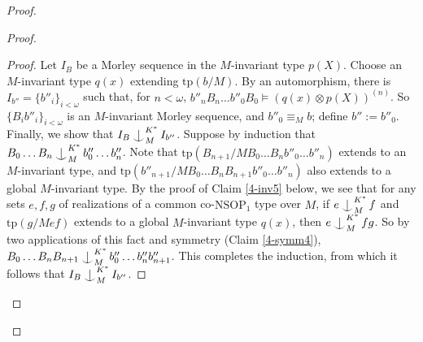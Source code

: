 \documentclass[12pt]{amsart}
\theoremstyle{definition}
\def\Ind#1#2{#1\setbox0=\hbox{$#1x$}\kern\wd0\hbox to 0pt{\hss$#1\mid$\hss}
\lower.9\ht0\hbox to 0pt{\hss$#1\smile$\hss}\kern\wd0}
\def\ind{\mathop{\mathpalette\Ind{}}}
\begin{document}
\begin{proof}
\begin{proof}
    \begin{proof}
    Let $I_{B}$ be a Morley sequence in the $M$-invariant type $p(X)$. Choose an $M$-invariant type $q(x)$ extending $\mathrm{tp}(b/M)$. By an automorphism, there is $I_{b''}=\{b''_{i}\}_{i < \omega}$ such that, for $n < \omega$, $b''_{n}B_{n} \ldots b''_{0}B_{0}\models (q(x)\otimes p(X))^{(n)} $. So $\{B_{i} b''_{i}\}_{i < \omega}$ is an $M$-invariant Morley sequence, and $b''_{0} \equiv_{M} b$; define $b'' := b''_{0}$. Finally, we show that $I_{B} \ind^{K^{*}}_{M} I_{b''}$. Suppose by induction that $B_{0} \ldots B_{n}\ind^{K^{*}}_{M}b''_{0} \ldots b''_{n}$. Note that $\mathrm{tp}(B_{n+1}/MB_{0}\ldots B_{n} b''_{0} \ldots b''_{n})$ extends to an $M$-invariant type, and $\mathrm{tp}(b''_{n+1}/MB_{0}\ldots B_{n}B_{n+1} b''_{0} \ldots b''_{n})$ also extends to a global $M$-invariant type. By the proof of Claim \ref{4-inv5} below, we see that for any sets $e, f, g$ of realizations of a common co-$\mathrm{NSOP}_{1}$ type over $M$, if $e \ind^{K^{*}}_{M} f$ and $\mathrm{tp}(g/Mef)$ extends to a global $M$-invariant type $q(x)$, then $e \ind^{K^{*}}_{M} fg$. So by two applications of this fact and symmetry (Claim \ref{4-symm4}), $B_{0} \ldots B_{n}B_{n+1}\ind^{K^{*}}_{M}b''_{0} \ldots b''_{n}b''_{n+1}$. This completes the induction, from which it follows that $I_{B} \ind^{K^{*}}_{M} I_{b''}$.
    \end{proof}


\end{proof}
\end{proof}
\end{document}
